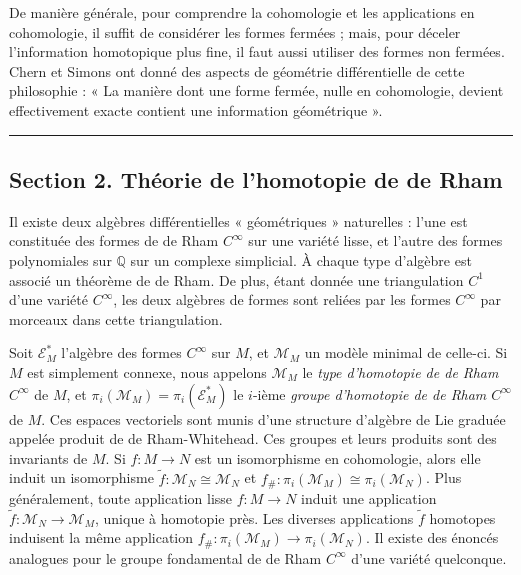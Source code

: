 \documentclass[
  french,
  a3paper,
  a3paper]{extarticle}
\begin{document}
De manière générale, pour comprendre la cohomologie et les applications
en cohomologie, il suffit de considérer les formes fermées ; mais, pour
déceler l'information homotopique plus fine, il faut aussi utiliser des
formes non fermées. Chern et Simons ont donné des aspects de géométrie
différentielle de cette philosophie : « La manière dont une forme
fermée, nulle en cohomologie, devient effectivement exacte contient une
information géométrique ».

\clearpage



\par

\vspace{0.7mm}\hrule\vspace{1.6mm}

\fontsize{9}{11}\selectfont

\subsection{Section 2. Théorie de l'homotopie de de
Rham}\label{section-2.-thuxe9orie-de-lhomotopie-de-de-rham}

Il existe deux algèbres différentielles « géométriques » naturelles :
l'une est constituée des formes de de Rham \(C^\infty\) sur une variété
lisse, et l'autre des formes polynomiales sur \(\mathbb Q\) sur un
complexe simplicial. À chaque type d'algèbre est associé un théorème de
de Rham. De plus, étant donnée une triangulation \(C^1\) d'une variété
\(C^\infty\), les deux algèbres de formes sont reliées par les formes
\(C^\infty\) par morceaux dans cette triangulation.

Soit \(\mathscr E_M^*\) l'algèbre des formes \(C^\infty\) sur \(M\), et
\(\mathcal M_M\) un modèle minimal de celle-ci. Si \(M\) est simplement
connexe, nous appelons \(\mathcal M_M\) le \emph{type d'homotopie de de
Rham \(C^\infty\)} de \(M\), et
\(\pi_i(\mathcal M_M)=\pi_i(\mathscr E_M^*)\) le \(i\)-ième \emph{groupe
d'homotopie de de Rham \(C^\infty\)} de \(M\). Ces espaces vectoriels
sont munis d'une structure d'algèbre de Lie graduée appelée produit de
de Rham-Whitehead. Ces groupes et leurs produits sont des invariants de
\(M\). Si \(f:M\to N\) est un isomorphisme en cohomologie, alors elle
induit un isomorphisme \(\tilde f:\mathcal M_N\cong\mathcal M_N\) et
\(f_\#:\pi_i(\mathcal M_M)\cong\pi_i(\mathcal M_N)\). Plus généralement,
toute application lisse \(f:M\to N\) induit une application
\(\tilde f:\mathcal M_N\to\mathcal M_M\), unique à homotopie près. Les
diverses applications \(\tilde f\) homotopes induisent la même
application \(f_\#:\pi_i(\mathcal M_M)\to\pi_i(\mathcal M_N)\). Il
existe des énoncés analogues pour le groupe fondamental de de Rham
\(C^\infty\) d'une variété quelconque.
\end{document}
